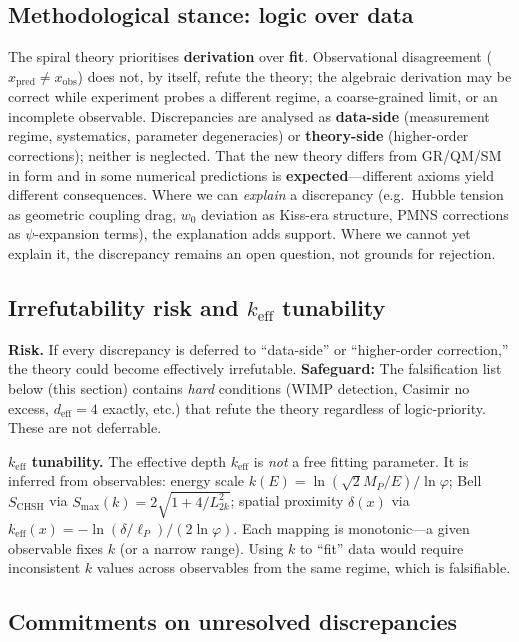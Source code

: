 \documentclass[12pt,a4paper]{article}
\begin{document}
\subsection{Methodological stance: logic over data}

The spiral theory prioritises \textbf{derivation} over \textbf{fit}. Observational disagreement ($x_{\mathrm{pred}} \neq x_{\mathrm{obs}}$) does not, by itself, refute the theory; the algebraic derivation may be correct while experiment probes a different regime, a coarse-grained limit, or an incomplete observable. Discrepancies are analysed as \textbf{data-side} (measurement regime, systematics, parameter degeneracies) or \textbf{theory-side} (higher-order corrections); neither is neglected. That the new theory differs from GR/QM/SM in form and in some numerical predictions is \textbf{expected}---different axioms yield different consequences. Where we can \emph{explain} a discrepancy (e.g.\ Hubble tension as geometric coupling drag, $w_0$ deviation as Kiss-era structure, PMNS corrections as $\psi$-expansion terms), the explanation adds support. Where we cannot yet explain it, the discrepancy remains an open question, not grounds for rejection.

\subsection{Irrefutability risk and $k_{\mathrm{eff}}$ tunability}

\textbf{Risk.} If every discrepancy is deferred to ``data-side'' or ``higher-order correction,'' the theory could become effectively irrefutable. \textbf{Safeguard:} The falsification list below (this section) contains \emph{hard} conditions (WIMP detection, Casimir no excess, $d_{\mathrm{eff}} = 4$ exactly, etc.) that refute the theory regardless of logic-priority. These are not deferrable.

\textbf{$k_{\mathrm{eff}}$ tunability.} The effective depth $k_{\mathrm{eff}}$ is \emph{not} a free fitting parameter. It is inferred from observables: energy scale $k(E) = \ln(\sqrt{2}M_P/E)/\ln\varphi$; Bell $S_{\mathrm{CHSH}}$ via $S_{\max}(k) = 2\sqrt{1+4/L_{2k}^2}$; spatial proximity $\delta(x)$ via $k_{\mathrm{eff}}(x) = -\ln(\delta/\ell_P)/(2\ln\varphi)$. Each mapping is monotonic---a given observable fixes $k$ (or a narrow range). Using $k$ to ``fit'' data would require inconsistent $k$ values across observables from the same regime, which is falsifiable.

\subsection{Commitments on unresolved discrepancies}
\end{document}
